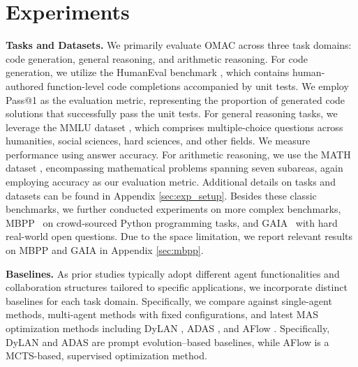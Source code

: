 
\section{Experiments}\label{sec:exp}



\noindent \textbf{Tasks and Datasets.} We primarily evaluate OMAC across three task domains: code generation, general reasoning, and arithmetic reasoning. For code generation, we utilize the HumanEval benchmark \cite{human-eval}, which contains human-authored function-level code completions accompanied by unit tests. We employ Pass@1 as the evaluation metric, representing the proportion of generated code solutions that successfully pass the unit tests. For general reasoning tasks, we leverage the MMLU dataset \cite{mmlu}, which comprises multiple-choice questions across humanities, social sciences, hard sciences, and other fields. We measure performance using answer accuracy. For arithmetic reasoning, we use the MATH dataset \cite{hendrycksmath2021}, encompassing mathematical problems spanning seven subareas, again employing accuracy as our evaluation metric. Additional details on tasks and datasets can be found in Appendix \ref{sec:exp_setup}. Besides these classic benchmarks, we further conducted experiments on more complex benchmarks, MBPP~\cite{austin2021program} on crowd-sourced Python programming tasks, and GAIA~\cite{mialon2023gaia} with hard real-world open questions. Due to the space limitation, we report relevant results on MBPP and GAIA in Appendix \ref{sec:mbpp}.










\noindent \textbf{Baselines.} As prior studies typically adopt different agent functionalities and collaboration structures tailored to specific applications, we incorporate distinct baselines for each task domain. Specifically, we compare against single-agent methods, multi-agent methods with fixed configurations, and latest MAS optimization methods including
DyLAN \cite{dylan}, ADAS \cite{hu2024automated}, and AFlow \cite{aflow}. Specifically, DyLAN and ADAS are prompt evolution–based baselines, while AFlow is a MCTS-based, supervised optimization method.




